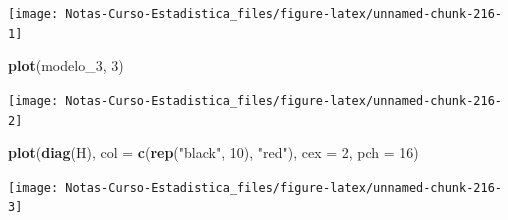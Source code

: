 \documentclass[
  12pt,
]{book}
\newenvironment{Shaded}{\begin{snugshade}}{\end{snugshade}}
\newcommand{\DataTypeTok}[1]{\textcolor[rgb]{0.13,0.29,0.53}{#1}}
\newcommand{\DecValTok}[1]{\textcolor[rgb]{0.00,0.00,0.81}{#1}}
\newcommand{\KeywordTok}[1]{\textcolor[rgb]{0.13,0.29,0.53}{\textbf{#1}}}
\newcommand{\NormalTok}[1]{#1}
\newcommand{\OperatorTok}[1]{\textcolor[rgb]{0.81,0.36,0.00}{\textbf{#1}}}
\newcommand{\StringTok}[1]{\textcolor[rgb]{0.31,0.60,0.02}{#1}}
\theoremstyle{definition}
\theoremstyle{definition}
\theoremstyle{definition}
\theoremstyle{remark}
\begin{document}
\begin{Shaded}
\end{Shaded}

\begin{center}\texttt{[image: Notas-Curso-Estadistica\_files/figure-latex/unnamed-chunk-216-1]} \end{center}

\begin{Shaded}
\begin{Highlighting}[]
\KeywordTok{plot}\NormalTok{(modelo_}\DecValTok{3}\NormalTok{, }\DecValTok{3}\NormalTok{)}
\end{Highlighting}
\end{Shaded}

\begin{center}\texttt{[image: Notas-Curso-Estadistica\_files/figure-latex/unnamed-chunk-216-2]} \end{center}

\begin{Shaded}
\begin{Highlighting}[]
\KeywordTok{plot}\NormalTok{(}\KeywordTok{diag}\NormalTok{(H), }\DataTypeTok{col =} \KeywordTok{c}\NormalTok{(}\KeywordTok{rep}\NormalTok{(}\StringTok{"black"}\NormalTok{, }\DecValTok{10}\NormalTok{), }\StringTok{"red"}\NormalTok{), }\DataTypeTok{cex =} \DecValTok{2}\NormalTok{, }
    \DataTypeTok{pch =} \DecValTok{16}\NormalTok{)}
\end{Highlighting}
\end{Shaded}

\begin{center}\texttt{[image: Notas-Curso-Estadistica\_files/figure-latex/unnamed-chunk-216-3]} \end{center}

\printbibliography
\end{document}
